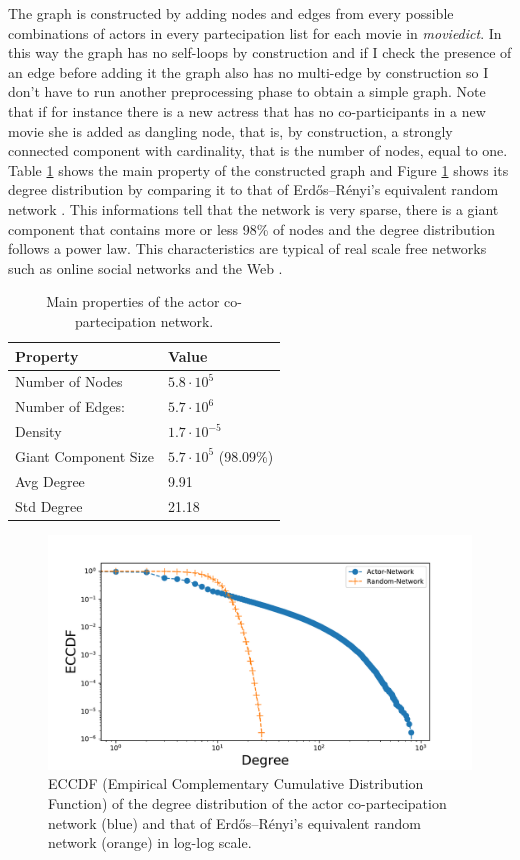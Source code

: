 \documentclass{article}
\begin{document}
The graph is constructed by adding nodes and edges from every possible combinations of actors in every partecipation list for each movie in \textit{moviedict}. In this way the graph has no self-loops by construction and if I check the presence of an edge before adding it the graph also has no multi-edge by construction so I don't have to run another preprocessing phase to obtain a simple graph. Note that if for instance there is a new actress that has no co-participants in a new movie she is added as dangling node, that is, by construction, a strongly connected component with cardinality, that is the number of nodes, equal to one.\\
Table \ref{tab:graph-property} shows the main property of the constructed graph and Figure \ref{fig:degree-distribution} shows its degree distribution by comparing it to that of Erdős–Rényi's equivalent random network \cite{erdos59a}. This informations tell that the network is very sparse, there is a giant component that contains more or less 98\% of nodes and the degree distribution follows a power law. This characteristics are typical of real scale free networks such as online social networks and the Web \cite{web2000}.
\begin{table}[h!]
\begin{tabular}{l|l}
\hline
Property &          Value \\
\hline
Number of Nodes &   $5.8 \cdot 10^{5}$ \\ [0.5ex]
Number of Edges: &  $5.7 \cdot 10^{6}$ \\ [0.5ex]
Density &        $1.7 \cdot 10^{-5}$ \\ [0.5ex]
Giant Component Size &   $5.7 \cdot 10^{5}$ (98.09\%) \\ [0.5ex]
Avg Degree &        9.91 \\ [0.5ex]
Std Degree &       21.18 \\ [0.5ex]
\end{tabular}
\caption{Main properties of the actor co-partecipation network.}
\label{tab:graph-property}
\end{table}

\begin{figure}[ht]
    \centering
    \includegraphics[width=\textwidth]{degree-distribution.pdf}
    \caption{ECCDF (Empirical Complementary Cumulative Distribution Function) of the degree distribution of the actor co-partecipation network (blue) and that of Erdős–Rényi's equivalent random network (orange) in log-log scale.}
    \label{fig:degree-distribution}
\end{figure}
\end{document}
